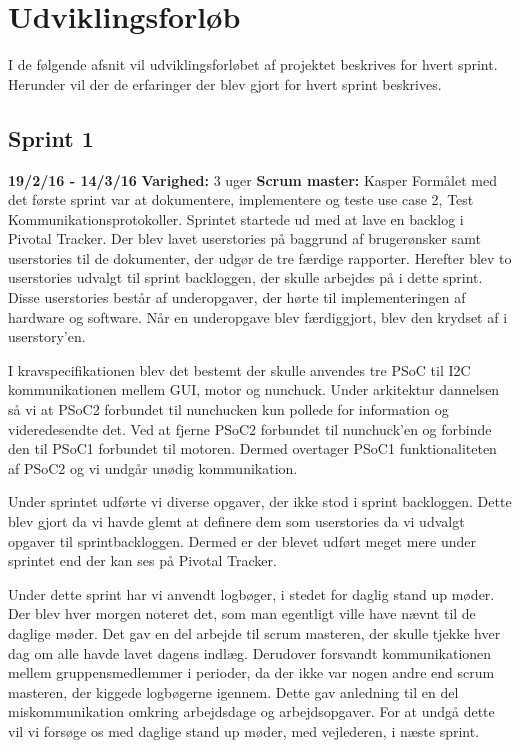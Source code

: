 \chapter{Udviklingsforløb}
I de følgende afsnit vil udviklingsforløbet af projektet beskrives for hvert sprint. Herunder vil der de erfaringer der blev gjort for hvert sprint beskrives.

	\section{Sprint 1}
	\textbf{19/2/16 - 14/3/16}\newline
	\textbf{Varighed:} 3 uger\newline
	\textbf{Scrum master: }Kasper \newline \newline
	Formålet med det første sprint var at dokumentere, implementere og teste use case 2, Test Kommunikationsprotokoller.
	Sprintet startede ud med at lave en backlog i Pivotal Tracker. Der blev lavet userstories på baggrund af brugerønsker samt userstories til de dokumenter, der udgør de tre færdige rapporter. Herefter blev to userstories udvalgt til sprint backloggen, der skulle arbejdes på i dette sprint. Disse userstories består af underopgaver, der hørte til implementeringen af hardware og software. Når en underopgave blev færdiggjort, blev den krydset af i userstory'en. \newline
	
	I kravspecifikationen blev det bestemt der skulle anvendes tre PSoC til I2C kommunikationen mellem GUI, motor og nunchuck. Under arkitektur dannelsen så vi at PSoC2 forbundet til nunchucken kun pollede for information og videredesendte det. Ved at fjerne PSoC2 forbundet til nunchuck'en og forbinde den til PSoC1 forbundet til motoren. Dermed overtager PSoC1 funktionaliteten af PSoC2 og vi undgår unødig kommunikation. \newline
	
	Under sprintet udførte vi diverse opgaver, der ikke stod i sprint backloggen. Dette blev gjort da vi havde glemt at definere dem som userstories da vi udvalgt opgaver til sprintbackloggen. Dermed er der blevet udført meget mere under sprintet end der kan ses på Pivotal Tracker. \newline
	
	Under dette sprint har vi anvendt logbøger, i stedet for daglig stand up møder. Der blev hver morgen noteret det, som man egentligt ville have nævnt til de daglige møder. Det gav en del arbejde til scrum masteren, der skulle tjekke hver dag om alle havde lavet dagens indlæg. Derudover forsvandt kommunikationen mellem gruppensmedlemmer i perioder, da der ikke var nogen andre end scrum masteren, der kiggede logbøgerne igennem. Dette gav anledning til en del miskommunikation omkring arbejdsdage og arbejdsopgaver. For at undgå dette vil vi forsøge os med daglige stand up møder, med vejlederen, i næste sprint. \newline
	
